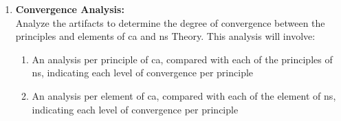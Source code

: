 \begin{enumerate}
\begin{enumerate}[label*={\arabic*.}]
    \end{enumerate}
    
    \item \textbf{Convergence Analysis:} \\
    Analyze the artifacts to determine the degree of convergence between the principles
    and elements of \gls{ca} and \gls{ns} Theory. This analysis will involve:
    \begin{enumerate}[label*={\arabic*.}]
        
        \item An analysis per principle of \gls{ca}, compared with each of the principles
        of \gls{ns}, indicating each level of convergence per principle
        
        \item An analysis per element of \gls{ca}, compared with each of the element of
        \gls{ns}, indicating each level of convergence per principle
    
    \end{enumerate}
\end{enumerate}